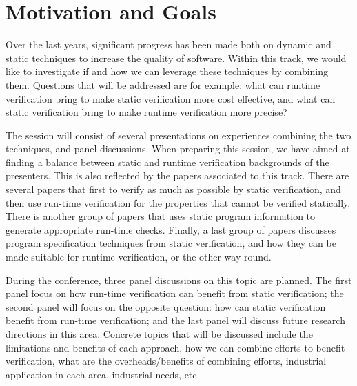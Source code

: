
\section{Motivation and Goals}

Over the last years, significant progress has been made both on dynamic and static techniques to increase the quality of software. Within this track, we would like to investigate if and how we can leverage these techniques by combining them. Questions that will be addressed are for example: what can runtime verification bring to make static verification more cost effective, and what can static verification bring to make runtime verification more precise? 

The session will consist of several presentations on experiences combining the two techniques, and panel discussions. When preparing this session, we have aimed at finding a balance between static and runtime verification backgrounds of the presenters. This is also reflected by the papers associated to this track. There are several papers that first to verify as much as possible by static verification, and then use run-time verification for the properties that cannot be verified statically. There is another group of papers that uses static program information to generate appropriate run-time checks. Finally, a last group of papers discusses program specification techniques from static verification, and how they can be made suitable for runtime verification, or the other way round.

During the conference, three panel discussions on this topic are planned. The first panel focus on how run-time verification can benefit from static verification; the second panel will focus on the opposite question: how can static verification benefit from run-time verification; and the last panel will discuss future research directions in this area. Concrete topics that will be discussed include the limitations and benefits of each approach, how we can combine efforts to benefit verification, what are the overheads/benefits of combining efforts, industrial application in each area, industrial needs, etc.



